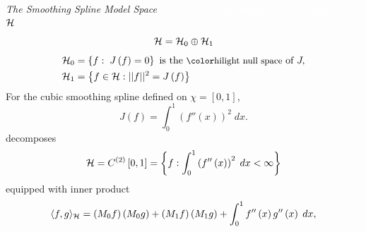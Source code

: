 \begin{frame}{\textit{The Smoothing Spline Model Space}}{\textcolor{white}{$J\left(f\right)$ induces an orthogonal decomposition of $\mathcal{H}$:}}
\footnotesize
\[
\mathcal{H} = \mathcal{H}_0 \oplus \mathcal{H}_1
\]
\begin{align*}
\mathcal{H}_0 &= \left\{ f:\; J\left(f\right) = 0\right\} \mbox{ is the \nt{null space} of } J, \\
\hilbert_1 &= \left\{ f \in \hilbert:  \vert \vert f \vert \vert^2 =  J\left(f\right) \right\}
\end{align*}
\footnotesize
For the cubic smoothing spline defined on $\chi = \left[0,1\right]$, 
\begin{equation*} %
J\left(f\right) = \int_0^1  \left(f''\left(x\right)\right)^2\;dx.
\end{equation*}
decomposes
\begin{equation*}
\mathcal{H} = C^{\left(2\right)}\left[0,1\right] = \left\{f: \int_{0}^1 \left(f''\left(x\right)\right)^2\;dx < \infty \right\}
\end{equation*}
equipped with inner product
\begin{align*} 
\langle f,g \rangle_\hilbert &= \left(M_{0} f \right)\left(M_{0} g\right) + \left(M_{1} f\right) \left(M_{1} g\right) + \int_0^1 f''\left(x\right)g''\left(x\right)\;dx,\\%
\end{align*}

\end{frame}


